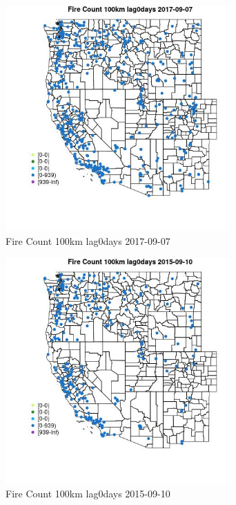 \begin{figure} 
\centering  
\includegraphics[width=0.77\textwidth]{Code_Outputs/Report_ML_input_PM25_Step4_part_e_de_duplicated_aves_compiled_2019-05-20wNAs_MapObsFire_Count_100km_lag0days2017-09-07.jpg} 
\caption{\label{fig:Report_ML_input_PM25_Step4_part_e_de_duplicated_aves_compiled_2019-05-20wNAsMapObsFire_Count_100km_lag0days2017-09-07}Fire Count 100km lag0days 2017-09-07} 
\end{figure} 
 

\clearpage 

\begin{figure} 
\centering  
\includegraphics[width=0.77\textwidth]{Code_Outputs/Report_ML_input_PM25_Step4_part_e_de_duplicated_aves_compiled_2019-05-20wNAs_MapObsFire_Count_100km_lag0days2015-09-10.jpg} 
\caption{\label{fig:Report_ML_input_PM25_Step4_part_e_de_duplicated_aves_compiled_2019-05-20wNAsMapObsFire_Count_100km_lag0days2015-09-10}Fire Count 100km lag0days 2015-09-10} 
\end{figure} 
 

